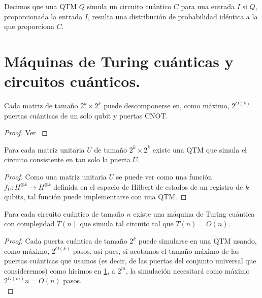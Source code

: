 \begin{defin}[Simulación]
Decimos que una QTM $Q$ simula un circuito cuántico $C$ para una entrada $I$ si $Q$, proporcionada la entrada $I$, resulta una distribución de probabilidad idéntica a la que proporciona $C$.
\end{defin} 

\section{Máquinas de Turing cuánticas y circuitos cuánticos.}

\begin{lema} Cada matriz de tamaño $2^k\times 2^k$ puede descomponerse en, como máximo, $2^{O(k)}$ puertas cuánticas de un solo qubit y puertas CNOT.
\end{lema}

\begin{proof}
Ver \cite{1995PhRvA..52.3457B}
\end{proof}

\begin{lema} Para cada matriz unitaria $U$ de tamaño $2^k\times 2^k$ existe una QTM que simula el circuito consistente en tan solo la puerta $U$.
\end{lema}

\begin{proof}
Como una matriz unitaria $U$ se puede ver como una función $f_U:H^{\otimes k}\rightarrow H^{\otimes k}$ definida en el espacio de Hilbert de estados de un registro de $k$ qubits, tal función puede implementarse con una QTM.
\end{proof}

\begin{redBox}
\begin{prop}
Para cada circuito cuántico de tamaño $n$ existe una máquina de Turing cuántica con complejidad $T(n)$ que simula tal circuito tal que $T(n)=O(n)$.
\end{prop}
\end{redBox}

\begin{proof}
Cada puerta cuántica de tamaño $2^k$ puede simularse en una QTM usando, como máximo, $2^{O(k)}$ pasos, así pues, si acotamos el tamaño máximo de las puertas cuánticas que usamos (es decir, de las puertas del conjunto universal que consideremos) como hicimos en \ref{},  a $2^m$, la simulación necesitará como máximo $2^{O(m)}n=O(n)$ pasos.\\
\end{proof}

